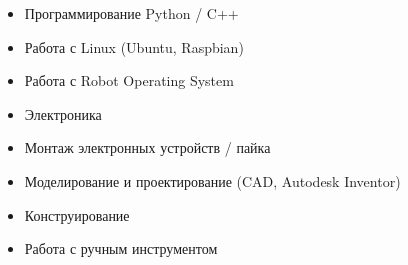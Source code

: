 \begin{itemize}
    \item Программирование Python / C++
    \item Работа с Linux (Ubuntu, Raspbian)
    \item Работа с Robot Operating System
    \item Электроника
    \item Монтаж электронных устройств / пайка
    \item Моделирование и проектирование (CAD, Autodesk Inventor)
    \item Конструирование
    \item Работа с ручным инструментом
\end{itemize}